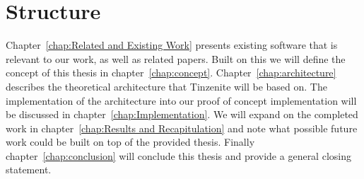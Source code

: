 \section{Structure}
\label{sec:Structure}

Chapter~\ref{chap:Related and Existing Work} presents existing software that is relevant to our work, as well as related papers.
Built on this we will define the concept of this thesis in chapter~\ref{chap:concept}.
Chapter~\ref{chap:architecture} describes the theoretical architecture that Tinzenite will be based on.
The implementation of the architecture into our proof of concept implementation will be discussed in chapter~\ref{chap:Implementation}.
We will expand on the completed work in chapter~\ref{chap:Results and Recapitulation} and note what possible future work could be built on top of the provided thesis.
Finally chapter~\ref{chap:conclusion} will conclude this thesis and provide a general closing statement.
